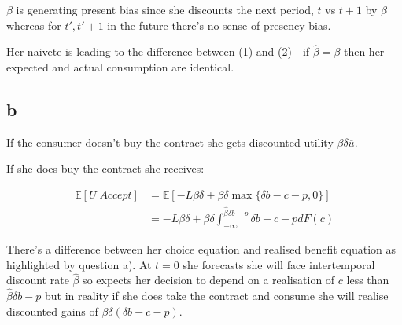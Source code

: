 \documentclass{article}
\begin{document}
$\beta$ is generating present bias since she discounts the next period, $t$ vs 
$t+1$ by $\beta$ whereas for $t', t'+1$ in the future there's no sense of 
presency bias.


Her naivete is leading to the difference between (1) and (2) - if $\hat{\beta} = \beta$
then her expected and actual consumption are identical.


\subsection*{b}


If the consumer doesn't buy the contract she gets discounted utility $\beta \delta \overline{u}$.

If she does buy the contract she receives:

\begin{align*}
    \mathbb{E}[U | \textit{Accept}] &= \mathbb{E}\left[ 
        -L\beta \delta + \beta \delta \max\{\delta b - c - p, 0\} 
    \right] \\
    &= -L \beta \delta + \beta \delta \int^{\hat{\beta}\delta b - p}_{-\infty} \delta b - c - p dF(c)
\end{align*}


There's a difference between her choice equation and realised benefit equation as 
highlighted by question a). At $t=0$ she forecasts she will face intertemporal 
discount rate $\hat{\beta}$ so expects her decision to depend on a realisation of 
$c$ less than $\hat{\beta}\delta b - p$ but in reality if she does take the 
contract and consume she will realise discounted gains of $\beta \delta (\delta b - c - p)$. 
\end{document}

